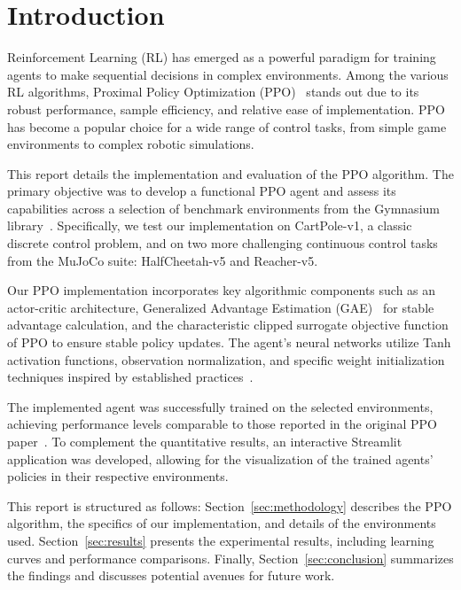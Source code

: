\section{Introduction}\label{sec:introduction}
Reinforcement Learning (RL) has emerged as a powerful paradigm for training agents to make sequential decisions in complex environments. Among the various RL algorithms, Proximal Policy Optimization (PPO)~\cite{schulman2017proximal} stands out due to its robust performance, sample efficiency, and relative ease of implementation. PPO has become a popular choice for a wide range of control tasks, from simple game environments to complex robotic simulations.

This report details the implementation and evaluation of the PPO algorithm. The primary objective was to develop a functional PPO agent and assess its capabilities across a selection of benchmark environments from the Gymnasium library~\cite{gymnasium2023}. Specifically, we test our implementation on CartPole-v1, a classic discrete control problem, and on two more challenging continuous control tasks from the MuJoCo suite: HalfCheetah-v5 and Reacher-v5.

Our PPO implementation incorporates key algorithmic components such as an actor-critic architecture, Generalized Advantage Estimation (GAE)~\cite{schulman2015high} for stable advantage calculation, and the characteristic clipped surrogate objective function of PPO to ensure stable policy updates. The agent's neural networks utilize Tanh activation functions, observation normalization, and specific weight initialization techniques inspired by established practices~\cite{PPOcode}.

The implemented agent was successfully trained on the selected environments, achieving performance levels comparable to those reported in the original PPO paper~\cite{schulman2017proximal}. To complement the quantitative results, an interactive Streamlit application was developed, allowing for the visualization of the trained agents' policies in their respective environments.

This report is structured as follows: Section~\ref{sec:methodology} describes the PPO algorithm, the specifics of our implementation, and details of the environments used. Section~\ref{sec:results} presents the experimental results, including learning curves and performance comparisons. Finally, Section~\ref{sec:conclusion} summarizes the findings and discusses potential avenues for future work.